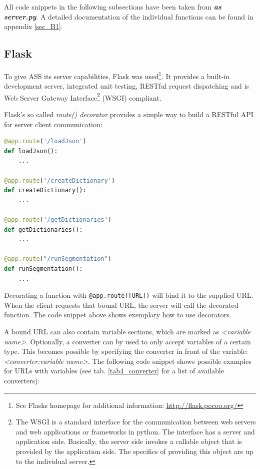 All code snippets in the following subsections have been taken from \emph{\textbf{as{\textunderscore} server.py}}. A detailed documentation of the individual functions can be found in appendix \ref{sec_B1}.


\subsection{Flask}
\label{sec4_flask}
To give ASS its server capabilities, Flask was used\footnote{
	See Flasks homepage for additional information: \url{http://flask.pocoo.org/}
}. It provides a built-in development server, integrated unit testing, RESTful request dispatching and is Web Server Gateway Interface\footnote{
		The WSGI is a standard interface for the communication between web servers and web applications or frameworks in python. The interface has a server and application side. Basically, the server side invokes a callable object that is provided by the application side. The specifics of providing this object are up to the individual server\cite{Brandl16}.
} (WSGI) compliant\cite{web:flask}.

Flask's so called \emph{route() decorator} provides a simple way to build a RESTful API for server client communication:

\begin{lstlisting}[language=Python, frame=single]
@app.route('/loadJson')
def loadJson(): 
	...

@app.route('/createDictionary')
def createDictionary():
	...

@app.route('/getDictionaries')
def getDictionaries():
	...
	
@app.route("/runSegmentation")
def runSegmentation():
	...
\end{lstlisting}

Decorating a function with \texttt{@app.route([URL])} will bind it to the supplied URL. When the client requests that bound URL, the server will call the decorated function\cite{web:flask}. The code snippet above shows exemplary how to use decorators.

A bound URL can also contain variable sections, which are marked as \emph{{\textless}variable name{\textgreater}}. Optionally, a converter can by used to only accept variables of a certain type. This becomes possible by specifying the converter in front of the variable: \emph{{\textless}converter:variable name{\textgreater}}\cite{web:flask}. The following code snippet shows possible examples for URLs with variables (see tab. \ref{tab4_converter} for a list of available converters):

